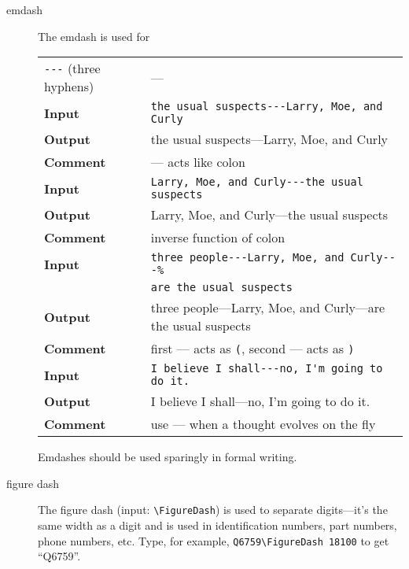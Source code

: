 \begin{description}
  \item[emdash]
    The emdash
    \cite{wikipedia-emdash}
     is used for
    \begin{singlespace}
      \begin{tabular}{@{}ll@{}}
        \toprule
        \verb+---+ (three hyphens)& ---\\[6pt]
        \bfseries Input& \verb+the usual suspects---Larry, Moe, and Curly+\\
        \bfseries Output& the usual suspects---Larry, Moe, and Curly\\
        \bfseries Comment& --- acts like colon\\[6pt]
        \bfseries Input& \verb+Larry, Moe, and Curly---the usual suspects+\\
        \bfseries Output& Larry, Moe, and Curly---the usual suspects\\
        \bfseries Comment& inverse function of colon\\[6pt]
        \bfseries Input& \verb+three people---Larry, Moe, and Curly---%+\\
        & \verb+are the usual suspects+\\
        \bfseries Output& three people---Larry, Moe, and Curly---are the usual suspects\\
        \bfseries Comment& first --- acts as \verb+(+, second --- acts as \verb+)+\\[6pt]
        \bfseries Input& \verb+I believe I shall---no, I'm going to do it.+\\
        \bfseries Output& I believe I shall---no, I'm going to do it.\\
        \bfseries Comment& use --- when a thought evolves on the fly\\
        \bottomrule
      \end{tabular}
    \end{singlespace}

    Emdashes should be used sparingly in formal writing.

  \item[figure dash]
    The figure dash
    (input: \verb+\FigureDash+)
    is used to separate digits---it's the same width
    as a digit and is used in identification numbers,
    part numbers,
    phone numbers, etc.
    Type, for example, \verb+Q6759\FigureDash 18100+
    to get ``Q6759''.


\end{description}
